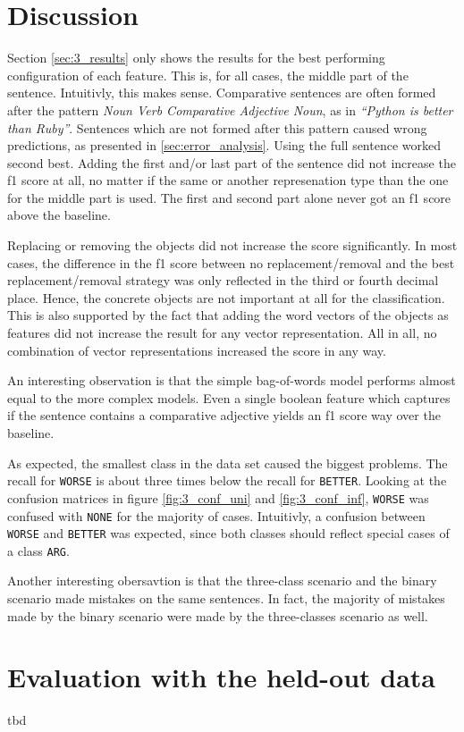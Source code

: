 \section{Discussion}
Section \ref{sec:3_results} only shows the results for the best performing configuration of each feature. This is, for all cases, the middle part of the sentence. Intuitivly, this makes sense. Comparative sentences are often formed after the pattern \emph{Noun Verb Comparative Adjective Noun}, as in \emph{\enquote{Python is better than Ruby}}. Sentences which are not formed after this pattern caused wrong predictions, as presented in \ref{sec:error_analysis}.
 Using the full sentence worked second best. Adding the first and/or last part of the sentence did not increase the f1 score at all, no matter if the same or another represenation type than the one for the middle part is used. The first and second part alone never got an f1 score above the baseline.

Replacing or removing the objects did not increase the score significantly. In most cases, the difference in the f1 score between no replacement/removal and the best replacement/removal strategy was only reflected in the third or fourth decimal place. Hence, the concrete objects are not important at all for the classification. This is also supported by the fact that adding the word vectors of the objects as features did not increase the result for any vector representation. All in all, no combination of vector representations increased the score in any way.

An interesting observation is that the simple bag-of-words model performs almost equal to the more complex models. Even a single boolean feature which captures if the sentence contains a comparative adjective yields an f1 score way over the baseline.

As expected, the smallest class in the data set caused the biggest problems. The recall for \texttt{WORSE} is about three times below the recall for \texttt{BETTER}. Looking at the confusion matrices in figure \ref{fig:3_conf_uni} and \ref{fig:3_conf_inf}, \texttt{WORSE} was confused with \texttt{NONE} for the majority of cases. Intuitivly, a confusion between \texttt{WORSE} and \texttt{BETTER} was expected, since both classes should reflect special cases of a class \texttt{ARG}.

Another interesting obersavtion is that the three-class scenario and the binary scenario made mistakes on the same sentences. In fact, the majority of mistakes made by the binary scenario were made by the three-classes scenario as well.


\section{Evaluation with the held-out data}
tbd
\label{sec:final}

